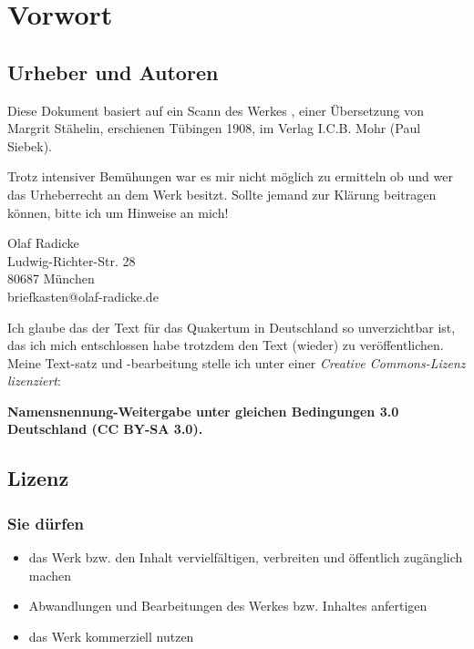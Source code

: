 \chapter{Vorwort}
\label{sec:vorwort}

\section{Urheber und Autoren}

Diese Dokument basiert auf ein Scann des Werkes , einer 
Übersetzung von Margrit Stähelin, erschienen Tübingen 1908, 
im Verlag I.C.B. Mohr (Paul Siebek). 


Trotz intensiver 
Bemühungen war es mir nicht möglich zu ermitteln ob und wer das 
Urheberrecht an dem Werk besitzt. Sollte jemand zur
Klärung beitragen können, bitte ich um Hinweise an mich!

\begin{center}
Olaf Radicke \\
Ludwig-Richter-Str. 28 \\
80687 München \\
briefkasten@olaf-radicke.de \\
\end{center}

Ich glaube das der Text für das Quakertum in Deutschland so 
unverzichtbar ist, das ich mich entschlossen habe trotzdem den Text 
(wieder) zu veröffentlichen. Meine Text-satz und -bearbeitung 
stelle ich unter 
einer \textit{Creative Commons-Lizenz lizenziert}: 

\bigskip

\begin{center}
\textbf{Namensnennung-Weitergabe unter gleichen Bedingungen 3.0 
Deutschland (CC BY-SA 3.0).}
\end{center}

\section{Lizenz}
\subsection*{Sie dürfen}

\begin{itemize}
 \item das Werk bzw. den Inhalt vervielfältigen, verbreiten und öffentlich zugänglich machen
 \item Abwandlungen und Bearbeitungen des Werkes bzw. Inhaltes anfertigen
 \item das Werk kommerziell nutzen
\end{itemize}

